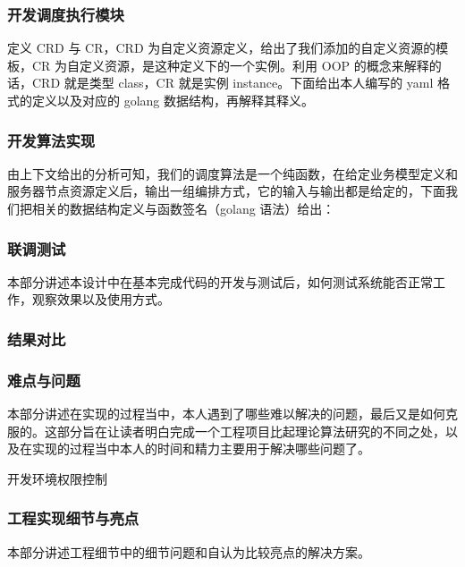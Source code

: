 \subsubsection{开发调度执行模块}

定义 CRD 与 CR，CRD 为自定义资源定义，给出了我们添加的自定义资源的模板，CR 为自定义资源，是这种定义下的一个实例。利用 OOP 的概念来解释的话，CRD 就是类型 class，CR 就是实例 instance。下面给出本人编写的 yaml 格式的定义以及对应的 golang 数据结构，再解释其释义。


\subsubsection{开发算法实现}

由上下文给出的分析可知，我们的调度算法是一个纯函数，在给定业务模型定义和服务器节点资源定义后，输出一组编排方式，它的输入与输出都是给定的，下面我们把相关的数据结构定义与函数签名（golang 语法）给出：


\subsubsection{联调测试}

本部分讲述本设计中在基本完成代码的开发与测试后，如何测试系统能否正常工作，观察效果以及使用方式。



\subsubsection{结果对比}

\subsubsection{难点与问题}

本部分讲述在实现的过程当中，本人遇到了哪些难以解决的问题，最后又是如何克服的。这部分旨在让读者明白完成一个工程项目比起理论算法研究的不同之处，以及在实现的过程当中本人的时间和精力主要用于解决哪些问题了。

开发环境权限控制

\subsubsection{工程实现细节与亮点}

本部分讲述工程细节中的细节问题和自认为比较亮点的解决方案。

